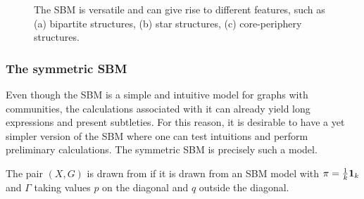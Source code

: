 \documentclass[../../main.tex]{subfiles} %
\begin{document}
\begin{figure}
	\centering
	\setlength\tabcolsep{4ex}
	\caption{The SBM is versatile and can give rise to different features, such 
		as (a) bipartite structures, (b) star structures, (c) core-periphery 
		structures.}
	\label{fig:sbm-versatile}
\end{figure}

\subsubsection{The symmetric SBM}
Even though the SBM is a simple and intuitive model for graphs with 
communities, the calculations associated with it can already yield long 
expressions and present subtleties. For this reason, it is desirable to 
have a yet simpler version of the SBM where one can test intuitions and 
perform 
preliminary calculations. The symmetric SBM is precisely such a model. 
\begin{definition}
	The pair \((X, G)\) is drawn from  if it is drawn from an 
	SBM model with \(\pi = \frac{1}{k} \ones[k]\) and \(\Gamma\) taking values 
	\(p\) on the diagonal and \(q\) outside the diagonal.
\end{definition}
\end{document}
